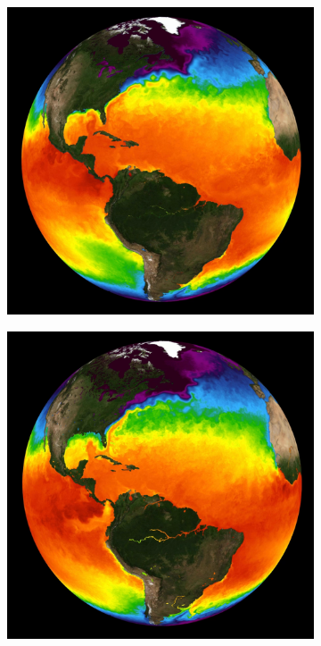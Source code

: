 \documentclass[journal]{vgtc}                %
\begin{document}
\begin{figure}[b]
	\begin{subfigure}[tb]{0.32\linewidth}
    	\includegraphics[width=\textwidth]{earth_temporal/earth_temporal_sea_surface1.png}
	\end{subfigure}
    \begin{subfigure}[tb]{0.32\linewidth}
    	\includegraphics[width=\textwidth]{earth_temporal/earth_temporal_sea_surface2.png}

\end{subfigure}
\end{figure}
\end{document}
